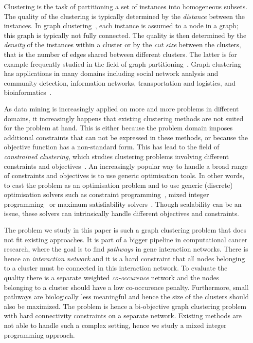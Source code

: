 \documentclass[conference]{IEEEtran}
\begin{document}
Clustering is the task of partitioning a set of instances into
homogeneous subsets. The quality of the clustering is typically determined by the \textit{distance} between the instances. In graph clustering~\cite{schaeffer2007graph}, each instance is assumed to a node in a graph; this graph is typically not fully connected. The quality is then determined by the \textit{density} of the instances within a cluster or by the \textit{cut size} between the clusters, that is the number of edges shared between different clusters. The latter is for example frequently studied in the field of graph partitioning~\cite{BulucMSS016}. Graph clustering has applications in many domains including social network analysis and community detection, information networks, transportation and logistics, and bioinformatics~\cite{schaeffer2007graph}.

As data mining is increasingly applied on more and more problems in different domains, it increasingly happens that existing clustering methods are not suited for the problem at hand. This is either because the problem domain imposes additional constraints that can not be expressed in these methods, or because the objective function has a non-standard form. This has lead to the field of \textit{constrained clustering}, which studies clustering problems involving different constraints and objectives~\cite{basu2008constrained}. An increasingly popular way to handle a broad range of constraints and objectives is to use generic optimisation tools. In other words, to cast the problem as an optimisation problem and to use generic (discrete) optimisation solvers such as constraint programming~\cite{DaoDV13}, mixed integer programming~\cite{DBLP:conf/aaai/GilpinND13,DBLP:conf/cpaior/BabakiGN14} or maximum satisfiability solvers~\cite{DBLP:journals/ai/BergJ17}. Though scalability can be an issue, these solvers can intrinsically handle different objectives and constraints.

The problem we study in this paper is such a graph clustering problem that does not fit existing approaches. It is part of a bigger pipeline in computational cancer research, where the goal is to find \textit{pathways} in gene interaction networks. There is hence an \textit{interaction network} and it is a hard constraint that all nodes belonging to a cluster must be connected in this interaction network. To evaluate the quality there is a separate weighted \textit{co-occurence} network and the nodes belonging to a cluster should have a low co-occurence penalty. Furthermore, small pathways are biologically less meaningful and hence the size of the clusters should also be maximized. The problem is hence a bi-objective graph clustering problem with hard connectivity constraints on a separate network. Existing methods are not able to handle such a complex setting, hence we study a mixed integer programming approach.
\end{document}
